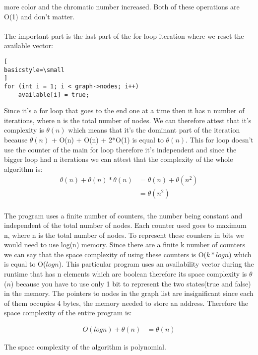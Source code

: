 \documentclass[runningheads]{llncs}
\begin{document}
more color and the chromatic number increased. Both of these operations are O(1) and don't matter.
\\
\\
The important part is the last part of the for loop iteration where we reset the available vector:
\begin{lstlisting}[
basicstyle=\small
]
for (int i = 1; i < graph->nodes; i++)
	available[i] = true;
\end{lstlisting}
\vspace{1em}
Since it's a for loop that goes to the end one at a time then it has n number of iterations, where n is the total number
of nodes. We can therefore attest that it's complexity is $\theta(n)$ which means that it's the dominant part
of the iteration because $\theta(n)$ + O(n) + O(n) + 2*O(1) is equal to $\theta(n)$. This for loop doesn't use
the counter of the main for loop therefore it's independent and since the bigger loop had n iterations we can
attest that the complexity of the whole algorithm is:
\begin{align*}
\theta(n) + \theta(n)*\theta(n) &= \theta(n) + \theta(n^2) \\
									  &= \theta(n^2) \\
\end{align*}

The program uses a finite number of counters, the number being constant and independent of the total number of nodes.
Each counter used goes to maximum n, where n is the total number of nodes. To represent these counters in bits
we would need to use log(n) memory. Since there are a finite k number of counters we can say that the space complexity
of using these counters is O($k*logn$) which is equal to O($logn$). This particular program uses an availability vector
during the runtime that has n elements which are boolean therefore its space complexity is $\theta$($n$) because you have to
use only 1 bit to represent the two states(true and false) in the memory. The pointers to nodes in the graph list are
insignificant since each of them occupies 4 bytes, the memory needed to store an address. Therefore the space complexity of the entire
program is:

\begin{align*}
O(logn) + \theta(n) &= \theta(n)
\end{align*}

The space complexity of the algorithm is polynomial.
\end{document}
